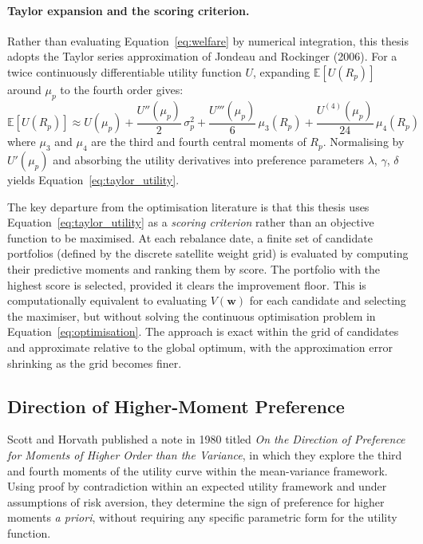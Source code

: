 \documentclass[12pt, a4paper]{article}
\begin{document}
\paragraph*{Taylor expansion and the scoring criterion.}
Rather than evaluating Equation~\eqref{eq:welfare} by numerical integration, this thesis
adopts the Taylor series approximation of Jondeau and Rockinger (2006). For a twice
continuously differentiable utility function $U$, expanding $\mathbb{E}[U(R_p)]$ around
$\mu_p$ to the fourth order gives:
\begin{equation}
  \mathbb{E}\!\left[U(R_p)\right]
  \approx U(\mu_p)
  + \frac{U''(\mu_p)}{2}\,\sigma^2_p
  + \frac{U'''(\mu_p)}{6}\,\mu_3(R_p)
  + \frac{U^{(4)}(\mu_p)}{24}\,\mu_4(R_p)
  \label{eq:taylor_full}
\end{equation}
where $\mu_3$ and $\mu_4$ are the third and fourth central moments of $R_p$. Normalising
by $U'(\mu_p)$ and absorbing the utility derivatives into preference parameters
$\lambda$, $\gamma$, $\delta$ yields Equation~\eqref{eq:taylor_utility}.

The key departure from the optimisation literature is that this thesis uses
Equation~\eqref{eq:taylor_utility} as a \textit{scoring criterion} rather than an objective
function to be maximised. At each rebalance date, a finite set of candidate portfolios
(defined by the discrete satellite weight grid) is evaluated by computing their predictive
moments and ranking them by score. The portfolio with the highest score is selected, provided
it clears the improvement floor. This is computationally equivalent to evaluating
$V(\mathbf{w})$ for each candidate and selecting the maximiser, but without solving the
continuous optimisation problem in Equation~\eqref{eq:optimisation}. The approach is exact
within the grid of candidates and approximate relative to the global optimum, with the
approximation error shrinking as the grid becomes finer.

\subsection{Direction of Higher-Moment Preference}

Scott and Horvath published a note in 1980 titled \textit{On the Direction of Preference for
Moments of Higher Order than the Variance}, in which they explore the third and fourth moments
of the utility curve within the mean-variance framework. Using proof by contradiction within an expected utility framework and under assumptions of risk aversion, they determine the sign of preference for higher moments \textit{a priori}, without requiring any specific parametric form for the utility function.
\end{document}
